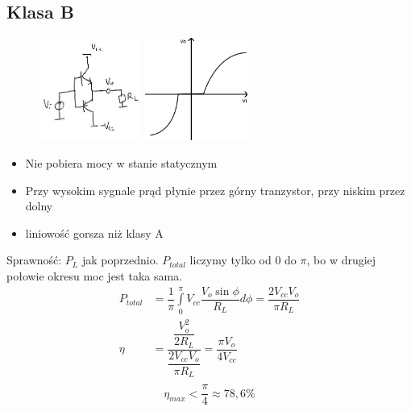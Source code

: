 \documentclass[10pt,a4paper]{article}
\begin{document}
\subsection{Klasa B}
\begin{figure}[H]
\centering
\includegraphics[width=0.3\textwidth]{wzm_moc_b.png}
\includegraphics[width=0.3\textwidth]{wzm_moc_b_wyk.png}
\end{figure}
\begin{itemize}
\item{Nie pobiera mocy w stanie statycznym}
\item{Przy wysokim sygnale prąd płynie przez górny tranzystor, przy niskim przez dolny}
\item{liniowość gorsza niż klasy A}
\end{itemize}

Sprawność:
$P_L$ jak poprzednio. $P_{total}$ liczymy tylko od $0$ do $\pi$, bo w drugiej połowie okresu moc jest taka sama.
\begin{align*}
P_{total} &= \dfrac{1}{\pi} \int \limits^\pi_0 V_{cc} \dfrac{V_o \sin \phi}{R_L} d\phi = \dfrac{2 V_{cc} V_o}{\pi R_L}\\
\eta &= \dfrac{\dfrac{V_o^2}{2 R_L}}{\dfrac{2 V_{cc} V_o}{\pi R_L}} = \dfrac{\pi V_o}{4 V_{cc}}\\
\end{align*}
\begin{equation}
\eta_{max} < \dfrac{\pi}{4} \approx 78,6\%
\end{equation}
\end{document}

